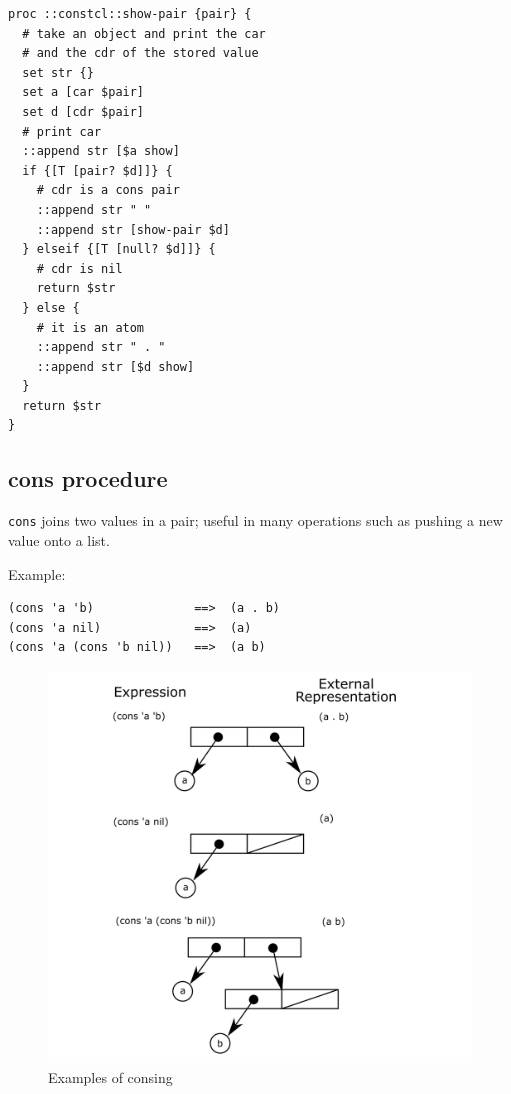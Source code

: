 \documentclass[twoside]{report}
\begin{document}
\begin{lstlisting}
proc ::constcl::show-pair {pair} {
  # take an object and print the car
  # and the cdr of the stored value
  set str {}
  set a [car $pair]
  set d [cdr $pair]
  # print car
  ::append str [$a show]
  if {[T [pair? $d]]} {
    # cdr is a cons pair
    ::append str " "
    ::append str [show-pair $d]
  } elseif {[T [null? $d]]} {
    # cdr is nil
    return $str
  } else {
    # it is an atom
    ::append str " . "
    ::append str [$d show]
  }
  return $str
}
\end{lstlisting}

\subsection{cons procedure}
\label{cons-procedure}

\texttt{cons} joins two values in a pair; useful in many operations such as pushing a new value onto a list.

Example:

\begin{verbatim}
(cons 'a 'b)              ==>  (a . b)
(cons 'a nil)             ==>  (a)
(cons 'a (cons 'b nil))   ==>  (a b)
\end{verbatim}

\begin{figure}[h!]\includegraphics{images/consing.png}\captionsetup{labelformat=empty}\caption{Examples of consing}\label{fig:examples-of-consing}\end{figure}
\end{document}
